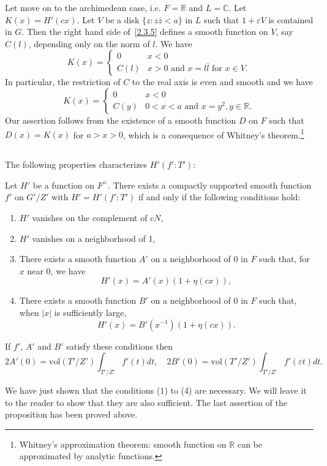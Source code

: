 Let move on to the archimedean case, i.e. $F = \mathbb{R}$ and $L = \mathbb{C}$.
Let $K(x) = H'(cx)$.
Let $V$ be a disk $\{z:z\bar{z} < a\}$ in $L$ such that $1 + \varepsilon V$ is contained in $G$.
Then the right hand side of~\eqref{2.3.5} defines a smooth function on $V$, say $C(l)$, depending only on the norm of $l$.
We have
\[
K(x) = \begin{cases} 0 & x < 0 \\ C(l) & x > 0 \text{ and } x = l \bar{l} \text{ for } x \in V.\end{cases}
\]
In particular, the restriction of $C$ to the real axis is even and smooth and we have
\[
K(x) = \begin{cases} 0 & x < 0 \\ C(y) & 0 <x < a\text{ and } x = y^2, y \in \mathbb{R}. \end{cases}
\]
Our assertion follows from the existence of a smooth function $D$ on $F$ such that $D(x) = K(x)$ for $a > x > 0$, which is a consequence of Whitney's theorem.\footnote{Whitney's approximation theorem: smooth function on $\mathbb{R}$ can be approximated by analytic functions.}

\subsection{}
The following properties characterizes $H'(f':T')$:
\begin{proposition}\label{prop:2.1}
Let $H'$ be a function on $F^\times$.
There exists a compactly supported smooth function $f'$ on $G'/Z'$ with $H' = H'(f':T')$ if and only if the following conditions hold:
\begin{enumerate}[label={(\arabic*)}]
    \item $H'$ vanishes on the complement of $cN$,
    \item $H'$ vanishes on a neighborhood of 1,
    \item There exists a smooth function $A'$ on a neighborhood of 0 in $F$ such that, for $x$ near 0, we have
    \[
    H'(x) = A'(x) (1 + \eta(cx)),
    \]
    \item There exists a smooth function $B'$ on a neighborhood of 0 in $F$ such that, when $|x|$ is sufficiently large,
    \[
    H'(x) = B'(x^{-1}) (1 + \eta(cx)) .
    \]
\end{enumerate}
If $f'$, $A'$ and $B'$ satisfy these conditions then
\[
2A'(0) = \mathrm{vol}(T'/Z') \int_{T'/Z'} f'(t)dt, \quad 2B'(0) = \mathrm{vol}(T'/Z') \int_{T'/Z'} f'(\varepsilon t) dt.
\]
\end{proposition}
We have just shown that the conditions (1) to (4) are necessary.
We will leave it to the reader to show that they are also sufficient.
The last assertion of the proposition has been proved above.